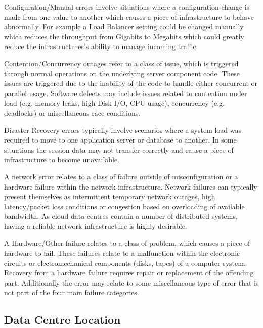 \documentclass[conference]{IEEEtran}
\begin{document}
Configuration/Manual errors involve situations where a configuration change is made from one value to another which causes a piece of infrastructure to behave abnormally. For example a Load Balancer setting could be changed manually which reduces the throughput from Gigabits to Megabits which could greatly reduce the infrastructures's ability to manage incoming traffic.\par

Contention/Concurrency outages refer to a class of issue, which is triggered through normal operations on the underlying server component code. These issues are triggered due to the inability of the code to handle either concurrent or parallel usage. Software defects may include issues related to contention under load (e.g. memory leaks, high Disk I/O, CPU usage), concurrency (e.g. deadlocks) or miscellaneous race conditions. \par

Disaster Recovery errors typically involve scenarios where a system load was required to move to one application server or database to another. In some situations the session data may not transfer correctly and cause a piece of infrastructure to become unavailable. \par

A network error relates to a class of failure outside of misconfiguration or a hardware failure within the network infrastructure. Network failures can typically present themselves as intermittent temporary network outages, high latency/packet loss conditions or congestion based on overloading of available bandwidth. As cloud data centres contain a number of distributed systems, having a reliable network infrastructure is highly desirable. \par

A Hardware/Other failure relates to a class of problem, which causes a piece of hardware to fail. These failures relate to a malfunction within the electronic circuits or electromechanical components (disks, tapes) of a computer system. Recovery from a hardware failure requires repair or replacement of the offending part. Additionally the error may relate to some miscellaneous type of error that is not part of the four main failure categories. \par

\subsection{Data Centre Location}
\end{document}
